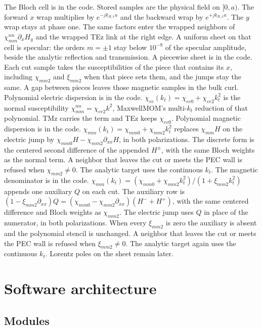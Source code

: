 \documentclass[11pt,a4paper]{article}
\numberwithin{equation}{section}
\begin{document}
The Bloch cell is in the code. Stored samples are the physical field on
$[0,a)$. The forward $x$ wrap multiplies by $e^{-j k_{B,x} a}$ and the
backward wrap by $e^{+j k_{B,x} a}$. The $y$ wrap stays at phase one.
The same factors enter the wrapped neighbors of
$\chi_{mm}^{nn}\partial_x H_y$ and the wrapped TEz link at the right edge.
A uniform sheet on that cell is specular: the orders $m=\pm 1$ stay below
$10^{-8}$ of the specular amplitude, beside the analytic reflection and
transmission. A piecewise sheet is in the code. Each cut sample takes
the susceptibilities of the piece that contains its $x$, including
$\chi_{mm2}$ and $\xi_{mm2}$ when that piece sets them, and the jumps
stay the same. A gap between pieces leaves those magnetic samples in
the bulk curl.
Polynomial electric dispersion is in the code.
$\chi_{ee}(k_t)=\chi_{ee0}+\chi_{ee2}k_t^2$ is the normal susceptibility
$\chi_{mm}^{nn}=\chi_{ee2}k^2$, MaxwellMOM's multi-$k_t$ reduction of
that polynomial. TMz carries the term and TEz keeps $\chi_{ee0}$.
Polynomial magnetic dispersion is in the code.
$\chi_{mm}(k_t)=\chi_{mm0}+\chi_{mm2}k_t^2$ replaces $\chi_{mm} H$
on the electric jump by $\chi_{mm0} H-\chi_{mm2}\partial_{xx} H$, in both
polarizations. The discrete form is the centered second difference of
the appended $H^\pm$, with the same Bloch weights as the normal term.
A neighbor that leaves the cut or meets the PEC wall is refused when
$\chi_{mm2}\ne 0$. The analytic target uses the continuous $k_t$.
The magnetic denominator is in the code.
$\chi_{mm}(k_t)=(\chi_{mm0}+\chi_{mm2}k_t^2)/(1+\xi_{mm2}k_t^2)$
appends one auxiliary $Q$ on each cut. The auxiliary row is
$(1-\xi_{mm2}\partial_{xx})Q=(\chi_{mm0}-\chi_{mm2}\partial_{xx})(H^-+H^+)$,
with the same centered difference and Bloch weights as $\chi_{mm2}$.
The electric jump uses $Q$ in place of the numerator, in both
polarizations. When every $\xi_{mm2}$ is zero the auxiliary is absent
and the polynomial stencil is unchanged. A neighbor that leaves the
cut or meets the PEC wall is refused when $\xi_{mm2}\ne 0$. The
analytic target again uses the continuous $k_t$. Lorentz poles on the
sheet remain later.

\section{Software architecture}
\label{sec:architecture}

\subsection{Modules}
\label{sec:modules}
\end{document}
